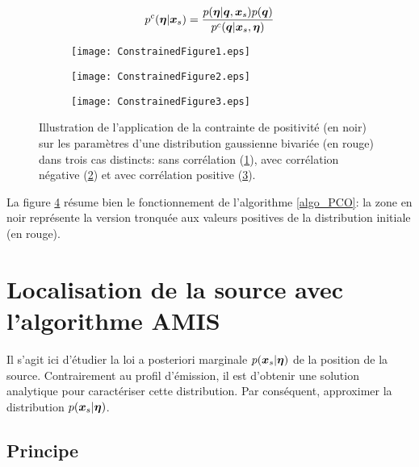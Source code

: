 \begin{equation}
p^c({\bm{\eta}} | {\bm{x}_s}) = \dfrac{p({\bm{\eta}} | {\bm{q}}, {\bm{x}_s})p({\bm{q}})}{p^c({\bm{q}} | {\bm{x}_s}, {\bm{\eta}})}
\label{eq_AE_17}
\end{equation}


 \begin{figure}[h!]
 	\centering
 	\begin{subfigure}[t]{0.5\textwidth}
 		\centering
		\texttt{[image: ConstrainedFigure1.eps]}
		\caption{}
 		\label{fig_AE_2_a}
 	\end{subfigure}%
 	\begin{subfigure}[t]{0.5\textwidth}
 		\centering
		\texttt{[image: ConstrainedFigure2.eps]}
		\caption{}
 		\label{fig_AE_2_b}
 	\end{subfigure}
 	\begin{subfigure}[t]{0.5\textwidth}
 		\centering
 		\texttt{[image: ConstrainedFigure3.eps]}
 		\caption{}
 		\label{fig_AE_2_c}
 	\end{subfigure} 

 	\caption{Illustration de l'application de la contrainte de positivité (en noir) sur les paramètres d'une distribution gaussienne bivariée (en rouge) dans trois cas distincts: sans corrélation (\ref{fig_AE_2_a}), avec corrélation négative (\ref{fig_AE_2_b}) et avec corrélation positive (\ref{fig_AE_2_c}).}
 	 \label{fig_AE_2}	
 \end{figure}

La figure \ref{fig_AE_2} résume bien le fonctionnement de l'algorithme \ref{algo_PCO}: la zone en noir représente la version tronquée aux valeurs positives de la distribution initiale (en rouge). 

\section{Localisation de la source avec l'algorithme AMIS}

Il s'agit ici d'étudier la loi a posteriori marginale $p({\bm{x}_s} | {\bm{\eta}})$ de la position de la source. Contrairement au profil d'émission, il est  d'obtenir une solution analytique pour caractériser cette distribution. Par conséquent, approximer la distribution $p({\bm{x}_s} | {\bm{\eta}})$. \\

\subsection{Principe}

